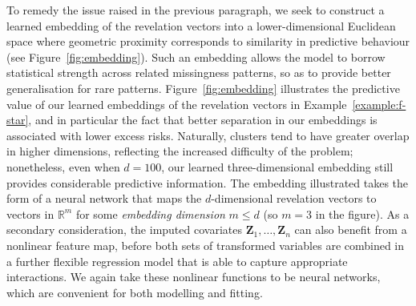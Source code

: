\documentclass[12pt]{article}
\begin{document}
To remedy the issue raised in the previous paragraph, we seek to construct a learned embedding of the revelation vectors into a lower-dimensional Euclidean space where geometric proximity corresponds to similarity in predictive behaviour (see Figure~\ref{fig:embedding}). Such an embedding allows the model to borrow statistical strength across related missingness patterns, so as to provide better generalisation for rare patterns.  Figure~\ref{fig:embedding} illustrates the predictive value of our learned embeddings of the revelation vectors in Example~\ref{example:f-star}, and in particular the fact that better separation in our embeddings is associated with lower excess risks.  Naturally, clusters tend to have greater overlap in higher dimensions, reflecting the increased difficulty of the problem; nonetheless, even when $d=100$, our learned three-dimensional embedding still provides considerable predictive information.  The embedding illustrated takes the form of a neural network that maps the $d$-dimensional revelation vectors to vectors in $\mathbb{R}^m$ for some \emph{embedding dimension} $m \leq d$ (so $m=3$ in the figure).  As a secondary consideration, the imputed covariates $\bm Z_1,\ldots,\bm Z_n$ can also benefit from a nonlinear feature map, before both sets of transformed variables are combined in a further flexible regression model that is able to capture appropriate interactions.  We again take these nonlinear functions to be neural networks, which are convenient for both modelling and fitting.
\end{document}
